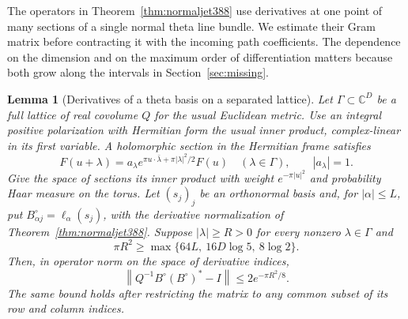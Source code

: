 \documentclass[a4paper,11pt]{article}
\newtheorem{lemma}[proposition]{Lemma}
\theoremstyle{definition}
\theoremstyle{remark}
\numberwithin{equation}{section}
\begin{document}
The operators in Theorem~\ref{thm:normaljet388} use derivatives
at one point of many sections of a single normal theta line
bundle. We estimate their Gram matrix before contracting it with
the incoming path coefficients. The dependence on the dimension
and on the maximum order of differentiation matters because both
grow along the intervals in Section~\ref{sec:missing}.

\begin{lemma}[Derivatives of a theta basis on a separated lattice]
\label{lem:thetaframe389}
Let \(\Gamma\subset\mathbb C^D\) be a full lattice of real
covolume \(Q\) for the usual Euclidean metric. Use an integral
positive polarization with Hermitian form the usual inner
product, complex-linear in its first variable. A holomorphic
section in the Hermitian frame satisfies
\[
 F(u+\lambda)=a_\lambda
    e^{\pi u\cdot\bar\lambda+\pi|\lambda|^2/2}F(u)
       \quad(\lambda\in\Gamma),\qquad |a_\lambda|=1 .
\]
Give the space of sections its inner product with weight
\(e^{-\pi|u|^2}\) and probability Haar measure on the torus.
Let \((s_j)_j\) be an orthonormal basis and, for \(|\alpha|\le L\),
put \(B^\circ_{\alpha j}=\ell_\alpha(s_j)\), with the derivative
normalization of Theorem~\ref{thm:normaljet388}. Suppose
\(|\lambda|\ge R>0\) for every nonzero \(\lambda\in\Gamma\) and
\[
       \pi R^2\ge \max\{64L,\ 16D\log 5,\ 8\log 2\}.
\]
Then, in operator norm on the space of derivative indices,
\[
     \left\|Q^{-1}B^\circ(B^\circ)^*-I\right\|
                  \le 2e^{-\pi R^2/8}.
\]
The same bound holds after restricting the matrix to any
common subset of its row and column indices.
\end{lemma}
\end{document}
